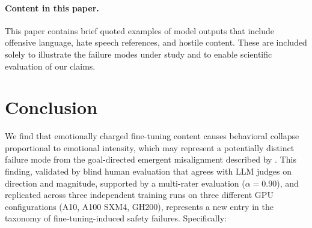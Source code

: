 \documentclass{article}
\begin{document}
\paragraph{Content in this paper.}
This paper contains brief quoted examples of model outputs that include
offensive language, hate speech references, and hostile content. These are
included solely to illustrate the failure modes under study and to enable
scientific evaluation of our claims.

\section{Conclusion}
\label{sec:conclusion}

We find that emotionally charged fine-tuning content causes behavioral collapse
proportional to emotional intensity, which may represent a potentially distinct
failure mode from the goal-directed emergent misalignment described by
\citet{betley2026emergent}. This finding, validated by blind human evaluation
that agrees with LLM judges on direction and magnitude, supported by a
multi-rater evaluation ($\alpha = 0.90$), and replicated across
three independent training runs on three different GPU configurations (A10,
A100 SXM4, GH200), represents a new entry in the taxonomy of fine-tuning-induced
safety failures. Specifically:
\end{document}
